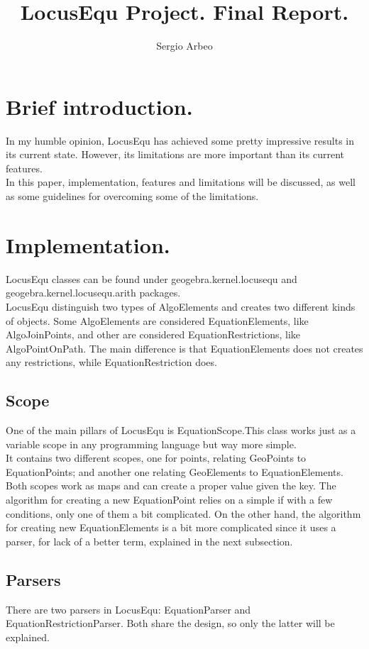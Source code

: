 \documentclass[12pt, oneside, a4paper]{article}
\begin{document}
\title{LocusEqu Project. Final Report.}
\author{Sergio Arbeo}\date{}\maketitle

\section{Brief introduction.}

In my humble opinion, LocusEqu has achieved some pretty impressive
results in its current state. However, its limitations are more important than 
its current features.\\

In this paper, implementation, features and limitations will be
discussed, as well as some guidelines for overcoming some of the
limitations.

\section{Implementation.}

LocusEqu classes can be found under geogebra.kernel.locusequ and
geogebra.kernel.locusequ.arith packages.\\

LocusEqu distinguish two types of AlgoElements and creates two
different kinds of objects. Some AlgoElements are considered
EquationElements, like AlgoJoinPoints, and other are considered
EquationRestrictions, like AlgoPointOnPath. The main difference is
that EquationElements does not creates any restrictions, while
EquationRestriction does.

\subsection{Scope}

One of the main pillars of LocusEqu is EquationScope.This class works
just as a variable scope in any programming language but way more
simple.\\

It contains two different scopes, one for points, relating GeoPoints
to EquationPoints; and another one relating GeoElements to
EquationElements. Both scopes work as maps and can create a proper
value given the key. The algorithm for creating a new EquationPoint
relies on a simple if with a few conditions, only one of them a bit
complicated. On the other hand, the algorithm for creating new
EquationElements is a bit more complicated since it uses a parser, for
lack of a better term, explained in the next subsection.

\subsection{Parsers}
\label{ss:Parsers}

There are two parsers in LocusEqu: EquationParser and
EquationRestrictionParser. Both share the design, so only the latter
will be explained.\\
\end{document}
